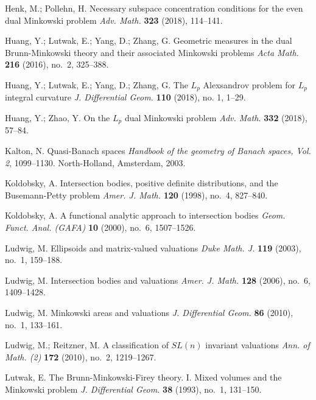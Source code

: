 \documentclass{cpamart1}     %
\theoremstyle{definition}
\theoremstyle{remark}
\begin{document}
\begin{thebibliography}{99}
Henk, M.; Pollehn, H.
Necessary subspace concentration conditions for the even dual Minkowski problem
\textit{Adv. Math.} 
\textbf{323} (2018), 114--141.



Huang, Y.; Lutwak, E.; Yang, D.; Zhang, G.
Geometric measures in the dual Brunn-Minkowski theory and their associated Minkowski problems
\textit{Acta Math.}
\textbf{216} (2016), no.\ 2, 325--388.

Huang, Y.; Lutwak, E.; Yang, D.; Zhang, G.
The $L_p$ Alexsandrov problem for $L_p$ integral curvature
\textit{J. Differential Geom.} 
\textbf{110} (2018), no. 1, 1--29.

Huang, Y.; Zhao, Y.
On the $L_p$ dual Minkowski problem
\textit{Adv. Math.} 
\textbf{332} (2018), 57--84.



Kalton, N.
Quasi-Banach spaces 
\textit{Handbook of the geometry of Banach spaces, Vol. 2}, 1099–1130.
North-Holland, Amsterdam, 2003.



Koldobsky, A.
Intersection bodies, positive definite distributions, and the Busemann-Petty problem
\textit{Amer. J. Math.}
\textbf{120} (1998), no.\ 4, 827--840.

Koldobsky, A.
A functional analytic approach to intersection bodies
\textit{Geom. Funct. Anal. (GAFA)} 
\textbf{10} (2000), no.\ 6, 1507--1526.



Ludwig, M.
Ellipsoids and matrix-valued valuations
\textit{Duke Math. J.} 
\textbf{119} (2003), no.\ 1, 159--188.

Ludwig, M.
Intersection bodies and valuations
\textit{Amer. J. Math.}
\textbf{128} (2006), no.\ 6, 1409--1428.

Ludwig, M.
Minkowski areas and valuations
\textit{J. Differential Geom.}
\textbf{86} (2010), no.\ 1, 133--161.


Ludwig, M.; Reitzner, M.
A classification of $SL(n)$ invariant valuations
\textit{Ann. of Math. (2)}  
\textbf{172} (2010), no.\ 2, 1219--1267.



Lutwak, E.
The Brunn-Minkowski-Firey theory. I. Mixed volumes and the Minkowski problem
\textit{J. Differential Geom.} 
\textbf{38} (1993), no.\ 1, 131--150.


\end{thebibliography}
\end{document}
